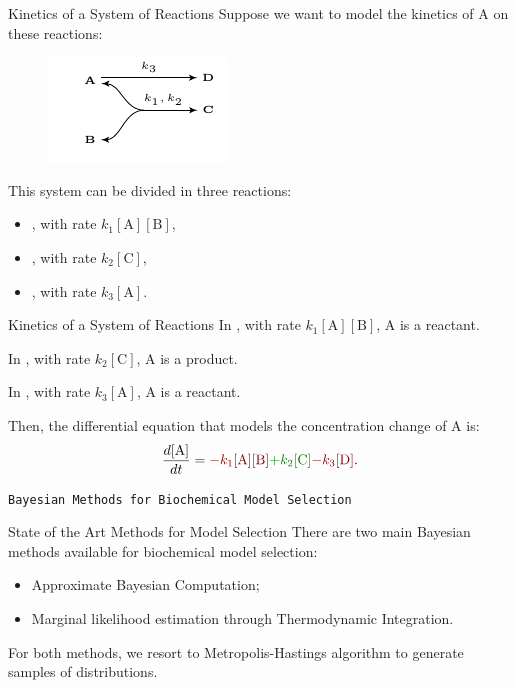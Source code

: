 \documentclass{beamer}
\begin{document}
\begin{frame}{Kinetics of a System of Reactions}
Suppose we want to model the kinetics of A on these reactions:
\begin{figure}
    \includegraphics[scale=1.5]{fundamental_concepts/system_reactions.pdf}
\end{figure}
This system can be divided in three reactions:
\begin{itemize}
    \pause
    \item{, with rate $k_1[\text{A}][\text{B}]$,}
    \pause
    \item{, with rate $k_2[\text{C}]$,}
    \pause
    \item{, with rate $k_3[\text{A}]$.}
\end{itemize}
\end{frame}

\begin{frame}{Kinetics of a System of Reactions}
In , with rate 
{\color{red!50!black}$k_1[\text{A}][\text{B}]$}, A is a reactant.
\pause

In , with rate 
{\color{green!50!black}$k_2[\text{C}]$}, A is a product.
\pause

In , with rate 
{\color{red!50!black}$k_3[\text{A}]$}, A is a reactant.
\pause

Then, the differential equation that models the concentration change of 
A is:
\pause
\begin{equation*}
    \frac{d[\text{A}]}{dt} = 
        {\color{red!50!black}- k_1[\text{A}][\text{B}]}
        {\color{green!50!black}+ k_2[\text{C}]}
        {\color{red!50!black}- k_3[\text{D}]}.
\end{equation*}
\end{frame}


\begin{frame}{}
\begin{center}
\texttt{Bayesian Methods for Biochemical Model Selection}
\end{center}
\end{frame}

\begin{frame}{State of the Art Methods for Model Selection}
There are two main Bayesian methods available for biochemical model 
selection:
\begin{itemize}
\pause
\item{Approximate Bayesian Computation;}

\pause
\item{Marginal likelihood estimation through Thermodynamic Integration.}
\end{itemize}

\pause
For both methods, we resort to Metropolis-Hastings algorithm to generate
samples of distributions.
\end{frame}
\end{document}
